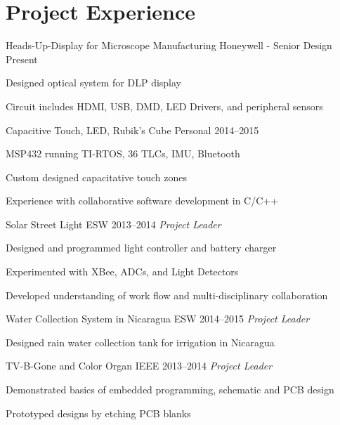 \documentclass[]{friggeri-cv} %
\begin{document}
\section{\sc Project Experience}
\begin{entrylist}
\entryFourItem
{Heads-Up-Display for Microscope Manufacturing}
{Honeywell - Senior Design}
{Present}
{\begin{itemizenosep}
	\item Designed optical system for DLP display
	\item Circuit includes HDMI, USB, DMD, LED Drivers, and peripheral sensors
\end{itemizenosep}}
\entryFourItem
{Capacitive Touch, LED, Rubik's Cube}
{Personal}
{2014--2015}
{\begin{itemizenosep}
	\item MSP432 running TI-RTOS, 36 TLCs, IMU, Bluetooth
	\item Custom designed capacitative touch zones
	\item Experience with collaborative software development in C/C++
\end{itemizenosep}}
\entry
{Solar Street Light}
{ESW}
{2013--2014}
{\emph{Project Leader}}
{\begin{itemizenosep}
	\item Designed and programmed light controller and battery charger
	\item Experimented with XBee, ADCs, and Light Detectors
	\item Developed understanding of work flow and multi-disciplinary collaboration
\end{itemizenosep}}
\entry
{Water Collection System in Nicaragua}
{ESW}
{2014--2015}
{\emph{Project Leader}}
{\begin{itemizenosep}
	\item Designed rain water collection tank for irrigation in Nicaragua
\end{itemizenosep}}
\vspace{-8pt}
\entry
{TV-B-Gone and Color Organ}
{IEEE}
{2013--2014}
{\emph{Project Leader}}
{\begin{itemizenosep}
	\item Demonstrated basics of embedded programming, schematic and PCB design
	\item Prototyped designs by etching PCB blanks
\end{itemizenosep}}
\end{entrylist}
\end{document}
